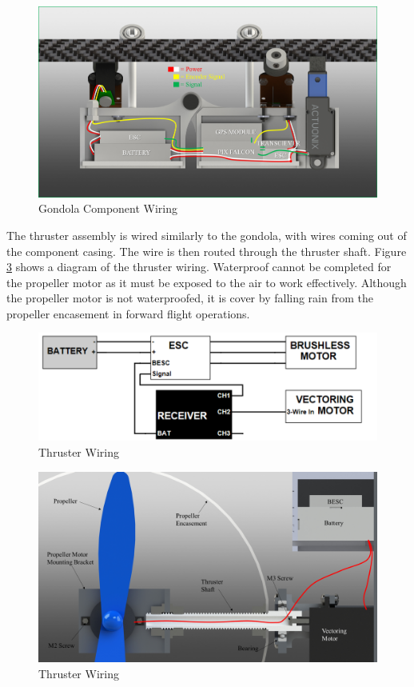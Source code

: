 \documentclass[../main.tex]{subfiles}
\begin{document}
\begin{figure}[H]
	\centering
	\includegraphics[width=.8\linewidth]{img/design/gondola/gondolaWiring.png}
	\caption{Gondola Component Wiring}
	\label{fig:gondolaWiring}
\end{figure}

The thruster assembly is wired similarly to the gondola, with wires coming out of the component casing. The wire is then routed through the thruster shaft. Figure \ref{fig:thrusterWiring} shows a diagram of the thruster wiring. Waterproof cannot be completed for the propeller motor as it must be exposed to the air to work effectively. Although the propeller motor is not waterproofed, it is cover by falling rain from the propeller encasement in forward flight operations.

\begin{figure}[H]
	\centering
	\includegraphics[width=.8\linewidth]{img/design/thruster/thrusterWiringSchematic.png}
	\caption{Thruster Wiring}
	\label{fig:thrusterWiringSchematic}
\end{figure}

\begin{figure}[H]
	\centering
	\includegraphics[width=.8\linewidth]{img/design/thruster/thrusterWiring.png}
	\caption{Thruster Wiring}
	\label{fig:thrusterWiring}
\end{figure}
\end{document}
